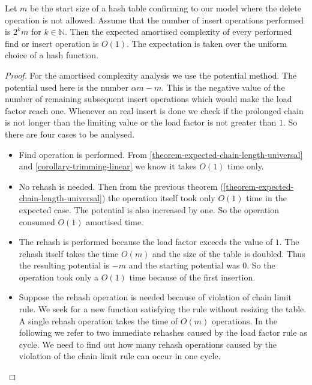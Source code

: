 \begin{theorem}
Let $m$ be the start size of a hash table confirming to our model where the delete operation is not allowed. Assume that the number of insert operations performed is $2^k m$ for $k \in \mathbb{N}$. Then the expected amortised complexity of every performed find or insert operation is $O(1)$. The expectation is taken over the uniform choice of a hash function. 
\end{theorem}
\begin{proof}
For the amortised complexity analysis we use the potential method. The potential used here is the number $\alpha m - m$. This is the negative value of the number of remaining subsequent insert operations which would make the load factor reach one. Whenever an real insert is done we check if the prolonged chain is not longer than the limiting value or the load factor is not greater than $1$. So there are four cases to be analysed.
\begin{itemize}
\item Find operation is performed. From \ref{theorem-expected-chain-length-universal} and \ref{corollary-trimming-linear} we know it takes $O(1)$ time only.

\item No rehash is needed. Then from the previous theorem (\ref{theorem-expected-chain-length-universal}) the operation itself took only $O(1)$ time in the expected case. The potential is also increased by one. So the operation consumed $O(1)$ amortised time.

\item The rehash is performed because the load factor exceeds the value of $1$. The rehash itself takes the time $O(m)$ and the size of the table is doubled. Thus the resulting potential is $-m$ and the starting potential was $0$. So the operation took only a $O(1)$ time because of the first insertion.

\item Suppose the rehash operation is needed because of violation of chain limit rule. We seek for a new function satisfying the rule without resizing the table. A single rehash operation takes the time of $O(m)$ operations. In the following we refer to two immediate rehashes caused by the load factor rule as cycle. We need to find out how many rehash operations caused by the violation of the chain limit rule can occur in one cycle. 


\end{itemize}
\end{proof}
